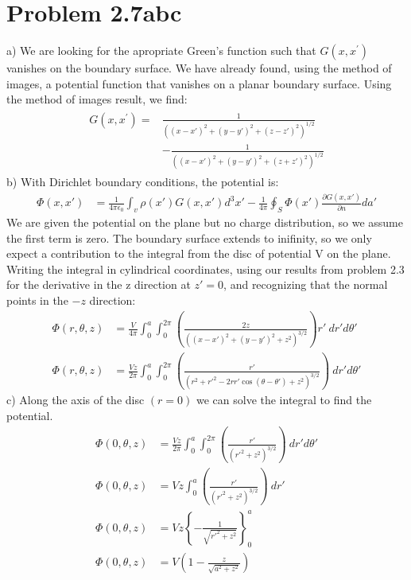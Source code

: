 \documentclass[a4paper,11pt]{article}
\numberwithin{equation}{section}
\newcommand{\ez}{\epsilon_0}
\newcommand{\lrp}[1]{\left({#1}\right)}
\newcommand{\lrb}[1]{\left\{{#1}\right\}}
\begin{document}
\section{Problem 2.7abc}
a) We are looking for the apropriate Green's function such that $G(x,x^\prime)$ vanishes on the boundary surface.
We have already found, using the method of images, a potential function that vanishes on a planar boundary surface.
Using the method of images result, we find:
\begin{align}
 \begin{split}
 G(x,x^\prime) = &\frac{1}{\lrp{(x-x')^2+(y-y')^2+(z-z')^2}^{1/2}}\\
		 &-\frac{1}{\lrp{(x-x')^2+(y-y')^2+(z+z')^2}^{1/2}}
 \end{split}
\end{align}
b) With Dirichlet boundary conditions, the potential is:
\begin{align}
 \Phi(x,x') &= \frac{1}{4\pi\ez}\int_v\rho(x')G(x,x')d^3x'-\frac{1}{4\pi}\oint_S\Phi(x')\frac{\partial G(x,x')}{\partial n}da'
\end{align}
We are given the potential on the plane but no charge distribution, so we assume the first term is zero.
The boundary surface extends to inifinity, so we only expect a contribution to the integral from the disc of potential V on the plane.
Writing the integral in cylindrical coordinates, using our results from problem 2.3 for the derivative in the z direction at $z'=0$,
and recognizing that the normal points in the $-z$ direction:
\begin{align}
 \Phi(r,\theta,z) &= \frac{V}{4\pi}\int_0^a\int_0^{2\pi}\lrp{\frac{2z}{\lrp{(x-x')^2+(y-y')^2+z^2}^{3/2}}}r'\ dr'd\theta'\\
 \Phi(r,\theta,z) &= \frac{Vz}{2\pi}\int_0^a\int_0^{2\pi}\lrp{\frac{r'}{\lrp{r^2+{r'}^2-2r{r'}\cos{(\theta-\theta')}+z^2}^{3/2}}}\ dr'd\theta'
\end{align}
c) Along the axis of the disc $(r=0)$ we can solve the integral to find the potential.
\begin{align}
 \Phi(0,\theta,z) &= \frac{Vz}{2\pi}\int_0^a\int_0^{2\pi}\lrp{\frac{r'}{\lrp{{r'}^2+z^2}^{3/2}}}\ dr'd\theta'\\
 \Phi(0,\theta,z) &= Vz\int_0^a\lrp{\frac{r'}{\lrp{{r'}^2+z^2}^{3/2}}}\ dr'\\
 \Phi(0,\theta,z) &= Vz\lrb{-\frac{1}{\sqrt{{r'}^2+z^2}}}_0^a\\
 \Phi(0,\theta,z) &= V\lrp{1-\frac{z}{\sqrt{a^2+z^2}}}
\end{align}
\end{document}
